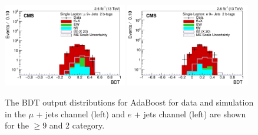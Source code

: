 \begin{figure}[ht!]
    \includegraphics[width=0.48\textwidth]{images/Run2/BDT_Mu29Aug400trees_5MinNodeSize_20nCuts_3MaxDepth_5adaboostbeta_adaBoost_alphaSTune_noMinEvents9nJets2nMtags_StackLogY.pdf}
    \includegraphics[width=0.48\textwidth]{images/Run2/BDT_El29Aug400trees_5MinNodeSize_20nCuts_3MaxDepth_5adaboostbeta_adaBoost_alphaSTune_noMinEvents9nJets2nMtags_StackLogY.pdf} 
    \caption{The BDT output distributions for AdaBoost for data and simulation in the $\mu$ + jets channel (left) and $e$ + jets channel (left) are shown for the $\geq9$ \njets  and 2 \nMtags category.}
    \label{fig:BDT_Mu29Aug400trees_5MinNodeSize_20nCuts_3MaxDepth_5adaboostbeta_adaBoost_alphaSTune_noMinEvents92}
\end{figure}

